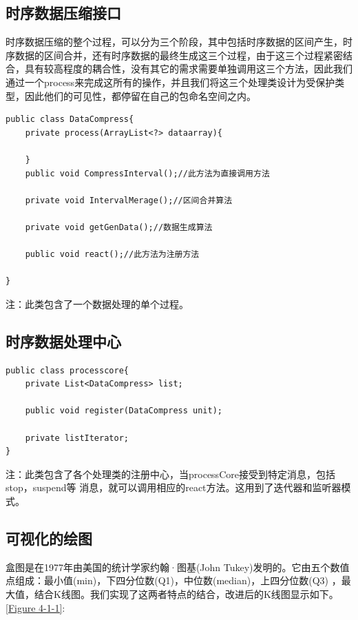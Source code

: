 \subsection{时序数据压缩接口}
时序数据压缩的整个过程，可以分为三个阶段，其中包括时序数据的区间产生，时序数据的区间合并，还有时序数据的最终生成这三个过程，由于这三个过程紧密结合，具有较高程度的耦合性，没有其它的需求需要单独调用这三个方法，因此我们通过一个process来完成这所有的操作，并且我们将这三个处理类设计为受保护类型，因此他们的可见性，都停留在自己的包命名空间之内。
\begin{lstlisting}
public class DataCompress{
	private process(ArrayList<?> dataarray){

	}
	public void CompressInterval();//此方法为直接调用方法

	private void IntervalMerage();//区间合并算法

	private void getGenData();//数据生成算法

	public void react();//此方法为注册方法

}
\end{lstlisting}
注：此类包含了一个数据处理的单个过程。


\subsection{时序数据处理中心}
\begin{lstlisting}
public class processcore{
	private List<DataCompress> list;

	public void register(DataCompress unit);

	private listIterator;
}
\end{lstlisting}

注：此类包含了各个处理类的注册中心，当processCore接受到特定消息，包括stop，suspend等
消息，就可以调用相应的react方法。这用到了迭代器和监听器模式。

\subsection{可视化的绘图}

盒图是在1977年由美国的统计学家约翰·图基(John Tukey)发明的。它由五个数值点组成：最小值(min)，下四分位数(Q1)，中位数(median)，上四分位数(Q3)
，最大值，结合K线图。我们实现了这两者特点的结合，改进后的K线图显示如下。\ref{Figure 4-1-1}:

